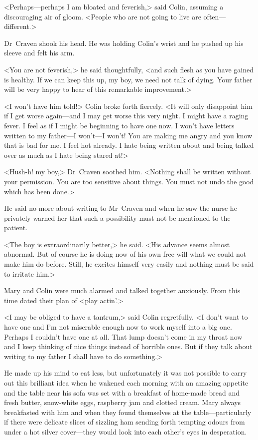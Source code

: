 <Perhaps—perhaps I am bloated and feverish,> said Colin, assuming a discouraging air of gloom. <People who are not going to live are often—different.>

Dr~Craven shook his head. He was holding Colin's wrist and he pushed up his sleeve and felt his arm.

<You are not feverish,> he said thoughtfully, <and such flesh as you have gained is healthy. If we can keep this up, my boy, we need not talk of dying. Your father will be very happy to hear of this remarkable improvement.>

<I won't have him told!> Colin broke forth fiercely. <It will only disappoint him if I get worse again—and I may get worse this very night. I might have a raging fever. I feel as if I might be beginning to have one now. I won't have letters written to my father—I won't—I won't! You are making me angry and you know that is bad for me. I feel hot already. I hate being written about and being talked over as much as I hate being stared at!>

<Hush-h! my boy,> Dr~Craven soothed him. <Nothing shall be written without your permission. You are too sensitive about things. You must not undo the good which has been done.>

He said no more about writing to Mr~Craven and when he saw the nurse he privately warned her that such a possibility must not be mentioned to the patient.

<The boy is extraordinarily better,> he said. <His advance seems almost abnormal. But of course he is doing now of his own free will what we could not make him do before. Still, he excites himself very easily and nothing must be said to irritate him.>

Mary and Colin were much alarmed and talked together anxiously. From this time dated their plan of <play actin'.>

<I may be obliged to have a tantrum,> said Colin regretfully. <I don't want to have one and I'm not miserable enough now to work myself into a big one. Perhaps I couldn't have one at all. That lump doesn't come in my throat now and I keep thinking of nice things instead of horrible ones. But if they talk about writing to my father I shall have to do something.>

He made up his mind to eat less, but unfortunately it was not possible to carry out this brilliant idea when he wakened each morning with an amazing appetite and the table near his sofa was set with a breakfast of home-made bread and fresh butter, snow-white eggs, raspberry jam and clotted cream. Mary always breakfasted with him and when they found themselves at the table—particularly if there were delicate slices of sizzling ham sending forth tempting odours from under a hot silver cover—they would look into each other's eyes in desperation.

